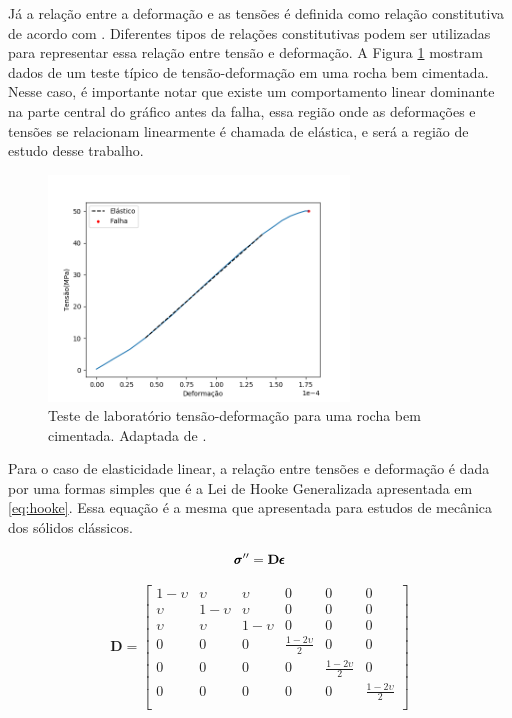 Já a relação entre a deformação e as tensões é definida como relação constitutiva de acordo com \citet{ResGeomec}. Diferentes tipos de relações constitutivas podem ser utilizadas para representar essa relação entre tensão e deformação. A Figura \ref{fig:stress_strain} mostram dados de um teste típico de tensão-deformação em uma rocha bem cimentada. Nesse caso, é importante notar que existe um comportamento linear dominante na parte central do gráfico antes da falha, essa região onde as deformações e tensões se relacionam linearmente é chamada de elástica, e será a região de estudo desse trabalho. %


\begin{figure}[!htbp]
\centering
\includegraphics[width=8cm]{chap01/figs/stress_strain.png}
\caption{Teste de laboratório tensão-deformação para uma rocha bem cimentada. Adaptada de \citet{ResGeomec}.}
\label{fig:stress_strain}
\end{figure}


Para o caso de elasticidade linear, a relação entre tensões e deformação é dada por uma formas simples  que é a Lei de Hooke Generalizada apresentada em \eqref{eq:hooke}. Essa equação é a mesma que apresentada para estudos de mecânica dos sólidos clássicos.

\begin{equation}{
\label{eq:hooke}
\pmb{\sigma}^{\prime\prime}= \mathbf{D} \pmb{\epsilon}}
\end{equation}


\begin{equation}\label{eq:ddefinition}
    \mathbf{D} = \begin{bmatrix}
 1-\upsilon & \upsilon    &  \upsilon & 0 & 0 & 0  \\
 \upsilon   &  1-\upsilon &  \upsilon & 0 & 0 & 0  \\
  \upsilon & \upsilon   &  1-\upsilon &  0 & 0 & 0 \\
 0& 0& 0 & \frac{1-2\upsilon}{2} & 0 & 0    \\
 0& 0& 0 & 0 &\frac{1-2\upsilon}{2} & 0     \\
 0& 0& 0 & 0 & 0 &  \frac{1-2\upsilon}{2}     \\
 
\end{bmatrix}
\end{equation}

